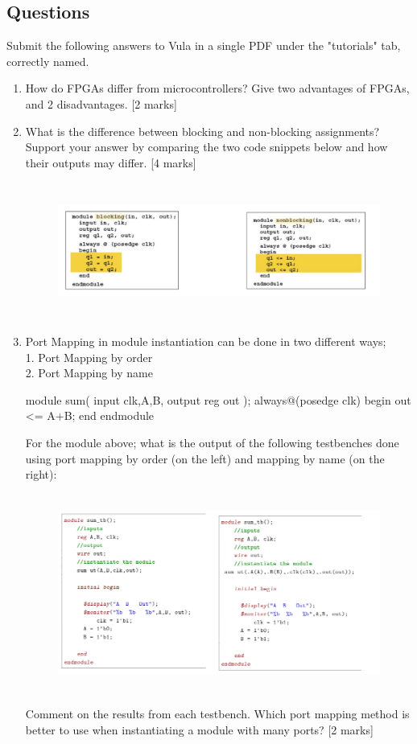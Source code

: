 \subsection{Questions}
Submit the following answers to Vula in a single PDF under the "tutorials" tab, correctly named.
\begin{enumerate}
    \item How do FPGAs differ from microcontrollers? Give two advantages of FPGAs, and 2 disadvantages. [2 marks]
    \item What is the difference between blocking and non-blocking assignments? Support your answer by comparing the two code snippets below and how their outputs may differ. [4 marks]
     \begin{figure}[H]
            \centering
            \includegraphics[width=1\columnwidth,height=4.5cm]{Figures/question 3.PNG}
            \label{fig: results}
    \end{figure}
    \item Port Mapping in module instantiation can be done in two different ways; \\
    1. Port Mapping by order\\
    2. Port Mapping by name
    
    \begin{Verilog}
module sum(
    input clk,A,B,
    output reg out
    );  
    always@(posedge clk)
    begin
	    out <= A+B;
    end
endmodule
    \end{Verilog}

For the module above; what is the output of the following testbenches done using port mapping by order (on the left) and mapping by name (on the right):
 \begin{figure}[H]
            \centering
            \includegraphics[width=1\columnwidth,height=6.5cm]{Figures/q4.PNG}
            \label{fig: results}
    \end{figure}

Comment on the results from each testbench. Which port mapping method is better to use when instantiating a module with many ports?  [2 marks]

\end{enumerate}

